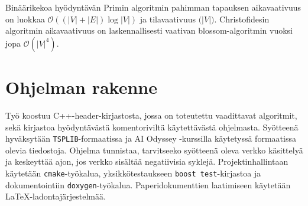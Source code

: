 \documentclass[a4paper]{scrartcl}
\begin{document}
Binäärikekoa hyödyntävän Primin algoritmin pahimman tapauksen
aikavaativuus on luokkaa $\mathcal{O}((|V|+|E|)\log|V|)$ ja
tilavaativuus $\mathcal(|V|)$. Christofidesin algoritmin aikavaativuus
on laskennallisesti vaativan blossom-algoritmin vuoksi jopa
$\mathcal{O}(|V|^4)$.

\section{Ohjelman rakenne}
Työ koostuu C++-header-kirjastosta, jossa on toteutettu vaadittavat
algoritmit, sekä kirjastoa hyödyntävästä komentoriviltä käytettävästä
ohjelmasta. Syötteenä hyväksytään \texttt{TSPLIB}-formaatissa\cite{tsplib}
ja AI Odyssey -kurssilla\cite{ai} käytetyssä formaatissa olevia tiedostoja.
Ohjelma tunnistaa, tarvitseeko syötteenä oleva verkko käsittelyä ja
keskeyttää ajon, jos verkko sisältää negatiivisia syklejä.
Projektinhallintaan käytetään \texttt{cmake}-työkalua\cite{cmake},
yksikkötestaukseen \texttt{boost test}-kirjastoa\cite{gtest} ja
dokumentointiin \texttt{doxygen}-työkalua\cite{doxygen}.
Paperidokumenttien laatimiseen käytetään
\LaTeX-ladontajärjestelmää\cite{latex}.



\end{document}
